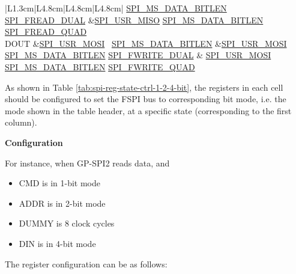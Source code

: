 \documentclass[main\_\_EN.tex]{subfiles}
\begin{document}
\begin{longtable}[c]{ |L{1.3cm}|L{4.8cm}|L{4.8cm}|L{4.8cm}| }
     \hyperref[fielddesc:SPIMSDATABITLEN]{SPI\_MS\_DATA\_BITLEN}
     \hyperref[fielddesc:SPIFREADDUAL]{SPI\_FREAD\_DUAL}
     &\hyperref[fielddesc:SPIUSRMISO]{SPI\_USR\_MISO}
     \hyperref[fielddesc:SPIMSDATABITLEN]{SPI\_MS\_DATA\_BITLEN}
     \hyperref[fielddesc:SPIFREADQUAD]{SPI\_FREAD\_QUAD}\\
     \hline
DOUT &\hyperref[fielddesc:SPIUSRMOSI]{SPI\_USR\_MOSI}       \
      \hyperref[fielddesc:SPIMSDATABITLEN]{SPI\_MS\_DATA\_BITLEN}
     &\hyperref[fielddesc:SPIUSRMOSI]{SPI\_USR\_MOSI}
     \hyperref[fielddesc:SPIMSDATABITLEN]{SPI\_MS\_DATA\_BITLEN}       \hyperref[fielddesc:SPIFWRITEDUAL]{SPI\_FWRITE\_DUAL} &
     \hyperref[fielddesc:SPIUSRMOSI]{SPI\_USR\_MOSI}
     \hyperref[fielddesc:SPIMSDATABITLEN]{SPI\_MS\_DATA\_BITLEN}       \hyperref[fielddesc:SPIFWRITEQUAD]{SPI\_FWRITE\_QUAD} \\
     \hline
\end{longtable}

As shown in Table \ref{tab:spi-reg-state-ctrl-1-2-4-bit}, the registers in each cell should be configured to set the FSPI bus to corresponding bit mode, i.e. the mode shown in the table header, at a specific state (corresponding to the first column).

\textbf{Configuration}

For instance, when GP-SPI2 reads data, and
\begin{itemize}
    \item CMD is in 1-bit mode
    \item ADDR is in 2-bit mode
    \item DUMMY is 8 clock cycles
    \item DIN is in 4-bit mode
\end{itemize}
The register configuration can be as follows:
\end{document}
